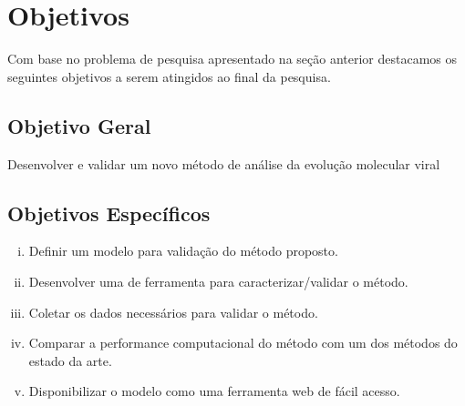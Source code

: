 \chapter{Objetivos}

Com base no problema de pesquisa apresentado na seção anterior destacamos os seguintes objetivos a serem atingidos ao final da pesquisa.
\section{Objetivo Geral}
Desenvolver e validar um novo método de análise da evolução molecular viral

\section{Objetivos Específicos}
\begin{enumerate}[(i)]
  \item Definir um modelo para validação do método proposto.
  \item Desenvolver uma de ferramenta para caracterizar/validar o método.
  \item Coletar os dados necessários para validar o método.
  \item Comparar a performance computacional do método com um dos  métodos do estado da arte.  
  \item Disponibilizar o modelo como uma ferramenta web de fácil acesso.
\end{enumerate}